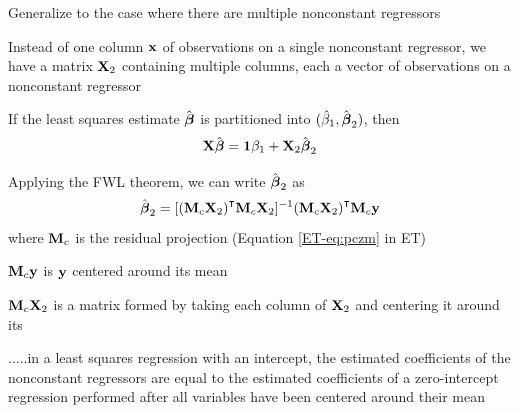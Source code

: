 \begin{frame}

    \vspace{2em}
    Generalize to the
    case where there are multiple nonconstant regressors
    
    Instead of one column ${\mathbf x}$ of observations on a
    single nonconstant regressor, we have a matrix $\mathbf X_2$ containing multiple
    columns, each a vector of observations on a nonconstant regressor
    
    \vspace{.7em}
    If the least squares estimate $\hat {\boldsymbol \beta}$ is partitioned into $(\hat \beta_1,
    \hat {\boldsymbol \beta}_2)$, then
    \begin{equation*}
        \mathbf X \hat {\boldsymbol \beta} = {\mathbf 1} \beta_1 + \mathbf X_2 \hat {\boldsymbol \beta}_2
    \end{equation*}
    
    
    Applying the FWL theorem, we can write
    $\hat {\boldsymbol \beta}_2$ as
    \begin{equation*}
        \hboldbeta_2 
            = [(\boldM_c\boldX_2)^\T \boldM_c \boldX_2]^{-1} (\boldM_c \boldX_2)^\T \boldM_c \boldy
    \end{equation*}
    where $\mathbf M_c$ is the residual projection  (Equation \eqref{ET-eq:pczm} in ET)
    
\end{frame}

\begin{frame}

    \vspace{2em}
    $\mathbf M_c {\mathbf y}$ is ${\mathbf y}$ centered around its mean
    
    $\mathbf M_c\mathbf X_2$ is a matrix formed by taking each column of
    $\mathbf X_2$ and centering it around its 
    
    \vspace{1em}
    .....in a least squares regression with an intercept, the
    estimated coefficients of the nonconstant regressors
    are equal to the estimated coefficients of a zero-intercept regression
    performed after all variables have been centered around their mean

\end{frame}

